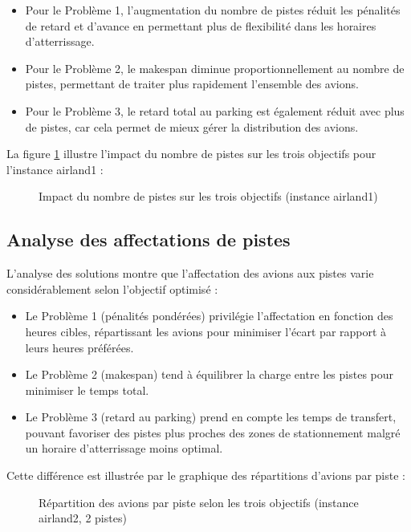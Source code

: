 \documentclass[a4paper,12pt]{report}
\begin{document}
\begin{itemize}
  \item Pour le Problème 1, l'augmentation du nombre de pistes réduit les pénalités de retard et d'avance en permettant plus de flexibilité dans les horaires d'atterrissage.
  \item Pour le Problème 2, le makespan diminue proportionnellement au nombre de pistes, permettant de traiter plus rapidement l'ensemble des avions.
  \item Pour le Problème 3, le retard total au parking est également réduit avec plus de pistes, car cela permet de mieux gérer la distribution des avions.
\end{itemize}

La figure \ref{fig:runway_impact} illustre l'impact du nombre de pistes sur les trois objectifs pour l'instance airland1 :

\begin{figure}[H]
  \centering
  \caption{Impact du nombre de pistes sur les trois objectifs (instance airland1)}
  \label{fig:runway_impact}
\end{figure}

\subsection{Analyse des affectations de pistes}
L'analyse des solutions montre que l'affectation des avions aux pistes varie considérablement selon l'objectif optimisé :

\begin{itemize}
  \item Le Problème 1 (pénalités pondérées) privilégie l'affectation en fonction des heures cibles, répartissant les avions pour minimiser l'écart par rapport à leurs heures préférées.
  \item Le Problème 2 (makespan) tend à équilibrer la charge entre les pistes pour minimiser le temps total.
  \item Le Problème 3 (retard au parking) prend en compte les temps de transfert, pouvant favoriser des pistes plus proches des zones de stationnement malgré un horaire d'atterrissage moins optimal.
\end{itemize}

Cette différence est illustrée par le graphique des répartitions d'avions par piste :

\begin{figure}[H]
  \centering
  \caption{Répartition des avions par piste selon les trois objectifs (instance airland2, 2 pistes)}
  \label{fig:runway_distribution}
\end{figure}
\end{document}
